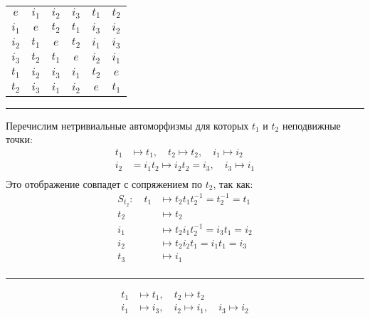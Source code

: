 \documentclass{article}
\begin{document}
\begin{enumerate}
\begin{itemize}
                \begin{center}
                \noindent\begin{tabular}{c | c c c c c}
                    $e$ & $i_1$ & $i_2$ & $i_3$ & $t_1$ & $t_2$ \\
                    \cline{1-6}
                    $i_1$ & $e$ & $t_2$ & $t_1$ & $i_3$ & $i_2$\\
                    $i_2$ & $t_1$ & $e$ & $t_2$ & $i_1$ & $i_3$\\
                    $i_3$ & $t_2$ & $t_1$ & $e$ & $i_2$ & $i_1$\\
                    $t_1$ & $i_2$ & $i_3$ & $i_1$ & $t_2$ & $e$\\
                    $t_2$ & $i_3$ & $i_1$ & $i_2$ & $e$ & $t_1$\\
                \end{tabular}
                \end{center}
                \hrule
                \vspace{2ex}
                Перечислим нетривиальные автоморфизмы для которых $t_1$ и $t_2$
                неподвижные точки:
                \begin{align*}
                    t_1&\mapsto t_1,\quad t_2\mapsto t_2,\quad i_1\mapsto i_2\\
                    i_2&=i_1t_2\mapsto i_2t_2 = i_3,\quad i_3\mapsto i_1\\
                \end{align*}
                Это отображение совпадет с сопряжением по $t_2$, так как:
                \begin{align*}
                    S_{t_2}:\quad t_1&\mapsto t_2t_1t_2^{-1}=t_2^{-1}=t_1\\
                    t_2&\mapsto t_2\\
                    i_1&\mapsto t_2i_1t_2^{-1} = i_3t_1 = i_2\\
                    i_2&\mapsto t_2i_2t_1 = i_1t_1 = i_3\\
                    t_3&\mapsto i_1\\
                \end{align*}
                \hrule
                \begin{align*}
                    t_1&\mapsto t_1,\quad t_2\mapsto t_2\\
                    i_1&\mapsto i_3,\quad i_2\mapsto i_1,\quad i_3\mapsto i_2\\
                \end{align*}

\end{itemize}
\end{enumerate}
\end{document}
